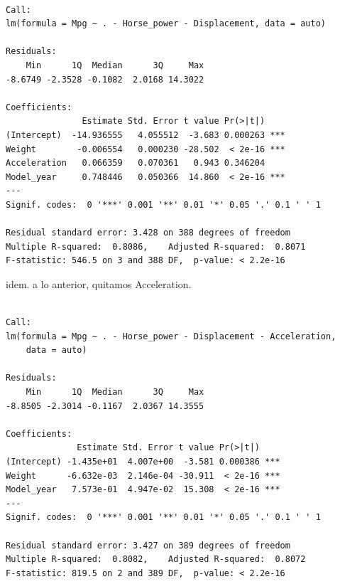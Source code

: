 \documentclass[
]{article}
\newenvironment{Shaded}{\begin{snugshade}}{\end{snugshade}}
\newcommand{\DataTypeTok}[1]{\textcolor[rgb]{0.13,0.29,0.53}{#1}}
\newcommand{\KeywordTok}[1]{\textcolor[rgb]{0.13,0.29,0.53}{\textbf{#1}}}
\newcommand{\NormalTok}[1]{#1}
\newcommand{\OperatorTok}[1]{\textcolor[rgb]{0.81,0.36,0.00}{\textbf{#1}}}
\newcommand{\StringTok}[1]{\textcolor[rgb]{0.31,0.60,0.02}{#1}}
\begin{document}
\begin{verbatim}

Call:
lm(formula = Mpg ~ . - Horse_power - Displacement, data = auto)

Residuals:
    Min      1Q  Median      3Q     Max 
-8.6749 -2.3528 -0.1082  2.0168 14.3022 

Coefficients:
               Estimate Std. Error t value Pr(>|t|)    
(Intercept)  -14.936555   4.055512  -3.683 0.000263 ***
Weight        -0.006554   0.000230 -28.502  < 2e-16 ***
Acceleration   0.066359   0.070361   0.943 0.346204    
Model_year     0.748446   0.050366  14.860  < 2e-16 ***
---
Signif. codes:  0 '***' 0.001 '**' 0.01 '*' 0.05 '.' 0.1 ' ' 1

Residual standard error: 3.428 on 388 degrees of freedom
Multiple R-squared:  0.8086,    Adjusted R-squared:  0.8071 
F-statistic: 546.5 on 3 and 388 DF,  p-value: < 2.2e-16
\end{verbatim}

idem. a lo anterior, quitamos Acceleration.

\begin{Shaded}
\end{Shaded}

\begin{verbatim}

Call:
lm(formula = Mpg ~ . - Horse_power - Displacement - Acceleration, 
    data = auto)

Residuals:
    Min      1Q  Median      3Q     Max 
-8.8505 -2.3014 -0.1167  2.0367 14.3555 

Coefficients:
              Estimate Std. Error t value Pr(>|t|)    
(Intercept) -1.435e+01  4.007e+00  -3.581 0.000386 ***
Weight      -6.632e-03  2.146e-04 -30.911  < 2e-16 ***
Model_year   7.573e-01  4.947e-02  15.308  < 2e-16 ***
---
Signif. codes:  0 '***' 0.001 '**' 0.01 '*' 0.05 '.' 0.1 ' ' 1

Residual standard error: 3.427 on 389 degrees of freedom
Multiple R-squared:  0.8082,    Adjusted R-squared:  0.8072 
F-statistic: 819.5 on 2 and 389 DF,  p-value: < 2.2e-16
\end{verbatim}
\end{document}
